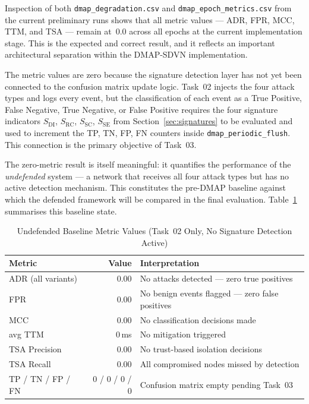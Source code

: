 Inspection of both \texttt{dmap\_degradation.csv} and
\texttt{dmap\_epoch\_metrics.csv} from the current
preliminary runs shows that all metric values ---
ADR, FPR, MCC, TTM, and TSA --- remain at~0.0 across
all epochs at the current implementation stage. This
is the expected and correct result, and it reflects
an important architectural separation within the
DMAP-SDVN implementation.

The metric values are zero because the signature
detection layer has not yet been connected to the
confusion matrix update logic. Task~02 injects the
four attack types and logs every event, but the
classification of each event as a True Positive,
False Negative, True Negative, or False Positive
requires the four signature indicators
$S_{\mathrm{DI}}$, $S_{\mathrm{RC}}$,
$S_{\mathrm{SC}}$, $S_{\mathrm{SE}}$ from
Section~\ref{sec:signatures} to be evaluated and
used to increment the TP, TN, FP, FN counters inside
\texttt{dmap\_periodic\_flush}. This connection is
the primary objective of Task~03.

The zero-metric result is itself meaningful: it
quantifies the performance of the \emph{undefended}
system --- a network that receives all four attack
types but has no active detection mechanism. This
constitutes the pre-DMAP baseline against which the
defended framework will be compared in the final
evaluation. Table~\ref{tab:zero_baseline} summarises
this baseline state.

\begin{table}[htb]
\centering
\caption{Undefended Baseline Metric Values
(Task~02 Only, No Signature Detection Active)}
\label{tab:zero_baseline}
\setlength{\tabcolsep}{4pt}
\begin{tabular}{lrl}
\hline
\textbf{Metric} & \textbf{Value} &
\textbf{Interpretation} \\
\hline
ADR (all variants) & 0.00 &
  No attacks detected --- zero true positives \\
FPR                & 0.00 &
  No benign events flagged --- zero false positives \\
MCC                & 0.00 &
  No classification decisions made \\
avg TTM            & 0\,ms &
  No mitigation triggered \\
TSA Precision      & 0.00 &
  No trust-based isolation decisions \\
TSA Recall         & 0.00 &
  All compromised nodes missed by detection \\
TP / TN / FP / FN  & 0 / 0 / 0 / 0 &
  Confusion matrix empty pending Task~03 \\
\hline
\end{tabular}
\end{table}

